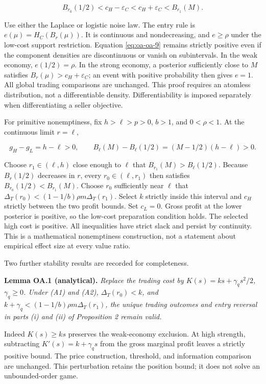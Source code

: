 \documentclass[
  11pt,
]{article}
\newcounter{none} %
\begin{document}
\[
B_{r_0}(1/2)<c_H-\varepsilon_C<c_H+\varepsilon_C<B_{r_1}(M).
\tag{OA.26}\label{eq:oa-oa-26}
\]

Use either the Laplace or logistic noise law. The entry rule is
\(e(\mu)=H_C(B_r(\mu))\). It is continuous and nondecreasing, and
\(e\ge\rho\) under the low-cost support restriction. Equation
\eqref{eq:oa-oa-9} remains strictly positive even if the component
densities are discontinuous or vanish on subintervals. In the weak
economy, \(e(1/2)=\rho\). In the strong economy, a posterior
sufficiently close to \(M\) satisfies \(B_r(\mu)>c_H+\varepsilon_C\); an
event with positive probability then gives \(e=1\). All global trading
comparisons are unchanged. This proof requires an atomless distribution,
not a differentiable density. Differentiability is imposed separately
when differentiating a seller objective.

For primitive nonemptiness, fix \(h>\ell>p>0\), \(b>1\), and
\(0<\rho<1\). At the continuous limit \(r=\ell\),

\[
g_H-g_L=h-\ell>0,\qquad
B_\ell(M)-B_\ell(1/2)=(M-1/2)(h-\ell)>0.
\tag{OA.27}\label{eq:oa-oa-27}
\]

Choose \(r_1\in(\ell,h)\) close enough to \(\ell\) that
\(B_{r_1}(M)>B_\ell(1/2)\). Because \(B_r(1/2)\) decreases in \(r\),
every \(r_0\in(\ell,r_1)\) then satisfies \(B_{r_0}(1/2)<B_{r_1}(M)\).
Choose \(r_0\) sufficiently near \(\ell\) that
\(\Delta_T(r_0)<(1-1/b)\rho m\Delta_T(r_1)\). Select \(k\) strictly
inside this interval and \(c_H\) strictly between the two profit bounds.
Set \(c_L=0\). Gross profit at the lower posterior is positive, so the
low-cost preparation condition holds. The selected high cost is
positive. All inequalities have strict slack and persist by continuity.
This is a mathematical nonemptiness construction, not a statement about
empirical effect size at every value ratio.

Two further stability results are recorded for completeness.


\protect{}\label{result-lemma-oa-1}{\textbf{Lemma OA.1
(analytical).}} \emph{Replace the trading cost by
\(K(s)=ks+\gamma_qs^2/2\), \(\gamma_q\ge0\). Under (A1) and (A2),
\(\Delta_T(r_0)<k\), and \(k+\gamma_q<(1-1/b)\rho m\Delta_T(r_1)\), the
unique trading outcomes and entry reversal in parts (i) and (ii) of
Proposition 2 remain valid.}

Indeed \(K(s)\ge ks\) preserves the weak-economy exclusion. At high
strength, subtracting \(K'(s)=k+\gamma_qs\) from the gross marginal
profit leaves a strictly positive bound. The price construction,
threshold, and information comparison are unchanged. This perturbation
retains the position bound; it does not solve an unbounded-order game.
\end{document}
